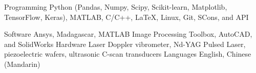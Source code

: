 

\begin{cvskillsv}

  \cvskillv
    {Programming} %
    {Python (Pandas, Numpy, Scipy, Scikit-learn, Matplotlib, TensorFlow, Keras), MATLAB, C/C++, LaTeX, Linux, Git, SCons, and API} %
    
  \cvskill
    {Software} %
    {Ansys, Madagascar, MATLAB Image Processing Toolbox, AutoCAD, and SolidWorks} %
  \cvskill
    {Hardware} %
    {Laser Doppler vibrometer, Nd-YAG Pulsed Laser, piezoelectric wafers, ultrasonic C-scan transducers} %
  \cvskill
    {Languages} %
    {English, Chinese (Mandarin)} %
\end{cvskillsv}
